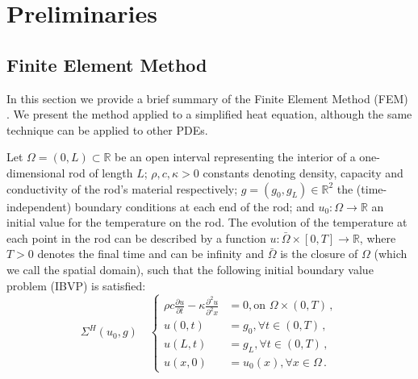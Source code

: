 \documentclass[letterpaper, 10 pt, conference]{ieeeconf/ieeeconf}
\newcommand*{\R}{\mathbb{R}}
\begin{document}
\section{Preliminaries}
\label{sec:preliminaries}

\subsection{Finite Element Method}
\label{sec:heat_equation_and_finite_element_analysis}

In this section we provide a brief summary of the Finite Element Method (FEM)
\cite{hughes_finite_2000}.
We present the method applied
to a simplified heat equation, although the same technique can be applied to other
PDEs. 

Let $\Omega = (0, L) \subset \R$ be an open interval representing the interior
of a one-dimensional rod of length $L$; $\rho, c, \kappa > 0$ 
constants denoting density, capacity and conductivity of the rod's material respectively;
$g = (g_0, g_L) \in \R^2$ the (time-independent) boundary conditions at each end of the rod; and $u_0 :
\Omega \rightarrow \R$ an initial value for the temperature on the rod. 
The evolution of the temperature at
each point in the rod can be described by a function $u : \bar \Omega \times [0,
T] \rightarrow \R$, where $T > 0$ denotes the final time and can be infinity and
$\bar \Omega$ is the closure of $\Omega$ (which we call the spatial domain),
such that the following initial boundary value problem (IBVP) is satisfied:
%
\begin{equation}\label{eq:pde}
    \Sigma^{H}(u_0, g) \quad \left \{
    \begin{aligned}
        \rho c \frac{\partial u}{\partial t} - \kappa \frac{\partial^2
        u}{\partial^2 x} &= 0, \text{on } \Omega \times (0, T) \,, \\
        u(0, t) &= g_0, \forall t \in (0, T) \,, \\
        u(L, t) &= g_L, \forall t \in (0, T) \,, \\
        u(x, 0) &= u_0(x), \forall x \in \Omega \,.
    \end{aligned}
    \right.
\end{equation}
\end{document}
